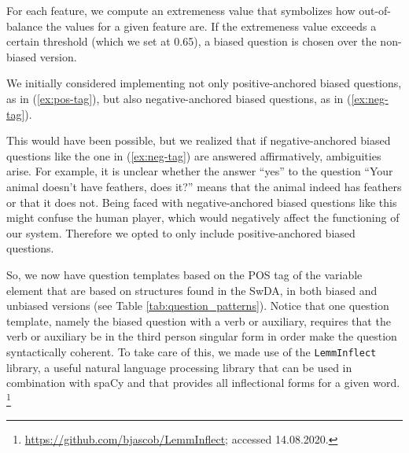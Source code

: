 \documentclass[11pt,a4paper]{article}
\begin{document}
For each feature, we compute an extremeness value that symbolizes how out-of-balance the \mbox{values} for a given feature are.
If the extremeness value exceeds a certain threshold (which we set at 0.65), a biased question is chosen over the non-biased version.

We initially considered implementing not only positive-anchored biased questions, as in (\ref{ex:pos-tag}), but also negative-anchored biased questions, as in (\ref{ex:neg-tag}).

\label{ex:pos-tag} 
\vspace{-1.25\baselineskip}
\label{ex:neg-tag}

This would have been possible, but we realized that if negative-anchored biased questions like the one in (\ref{ex:neg-tag}) are answered affirmatively, ambiguities arise.
For example, it is unclear whether the answer ``yes'' to the question ``Your animal doesn't have feathers, does it?'' means that the animal indeed has feathers or that it does not.
Being faced with negative-anchored biased questions like this might confuse the human player, which would negatively affect the functioning of our system.
Therefore we opted to only include positive-anchored biased questions.

So, we now have question templates based on the POS tag of the variable element that are based on structures found in the SwDA, in both biased and unbiased versions (see Table \ref{tab:question_patterns}).
Notice that one question template, namely the biased question with a verb or auxiliary, requires that the verb or auxiliary be in the third person singular form in order make the question syntactically coherent. 
To take care of this, we made use of the \texttt{LemmInflect} library, a useful natural language processing library that can be used in combination with spaCy and that provides all inflectional forms for a given word.%
	\footnote{\url{https://github.com/bjascob/LemmInflect}; accessed 14.08.2020.}
\end{document}
